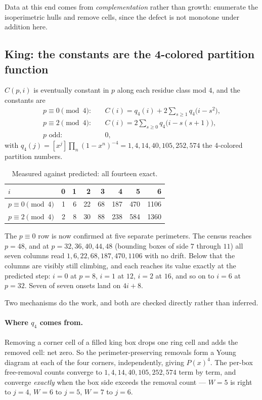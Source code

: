 \documentclass[11pt]{article}
\begin{document}
Data at this end comes from \emph{complementation} rather than growth: enumerate
the isoperimetric hulls and remove cells, since the defect is not monotone under
addition here.

\subsection{King: the constants are the 4-colored partition function}

$C(p,i)$ is eventually constant in $p$ along each residue class mod $4$, and the
constants are
\[
\begin{aligned}
  p \equiv 0 \pmod 4:&\quad C(i) = q_4(i) + 2\sum_{s\ge1} q_4\bigl(i - s^2\bigr), \\
  p \equiv 2 \pmod 4:&\quad C(i) = 2\sum_{s\ge0} q_4\bigl(i - s(s+1)\bigr), \\
  p \text{ odd}:&\quad 0,
\end{aligned}
\]
with $q_4(j) = [x^j]\prod_n (1-x^n)^{-4} = 1, 4, 14, 40, 105, 252, 574$ the
4-colored partition numbers.

\begin{table}[H]
\centering\small
\begin{tabular}{l r r r r r r r}
\toprule
$i$ & 0 & 1 & 2 & 3 & 4 & 5 & 6 \\
\midrule
$p \equiv 0 \pmod 4$ & 1 & 6 & 22 & 68 & 187 & 470 & 1106 \\
$p \equiv 2 \pmod 4$ & 2 & 8 & 30 & 88 & 238 & 584 & 1360 \\
\bottomrule
\end{tabular}
\caption{Measured against predicted: all fourteen exact.}
\label{tab:mincoeffs}
\end{table}

The $p \equiv 0$ row is now confirmed at five separate perimeters. The census
reaches $p = 48$, and at $p = 32, 36, 40, 44, 48$ (bounding boxes of side $7$
through $11$) all seven columns read $1, 6, 22, 68, 187, 470, 1106$ with no
drift. Below that the columns are visibly still climbing, and each reaches its
value exactly at the predicted step: $i = 0$ at $p = 8$, $i = 1$ at $12$,
$i = 2$ at $16$, and so on to $i = 6$ at $p = 32$. Seven of seven onsets land on
$4i + 8$.

Two mechanisms do the work, and both are checked directly rather than inferred.

\paragraph{Where $q_4$ comes from.} Removing a corner cell of a filled king box
drops one ring cell and adds the removed cell: net zero. So the
perimeter-preserving removals form a Young diagram at each of the four corners,
independently, giving $P(x)^4$. The per-box free-removal counts converge to
$1,4,14,40,105,252,574$ term by term, and converge \emph{exactly} when the box
side exceeds the removal count --- $W=5$ is right to $j=4$, $W=6$ to $j=5$,
$W=7$ to $j=6$.
\end{document}
